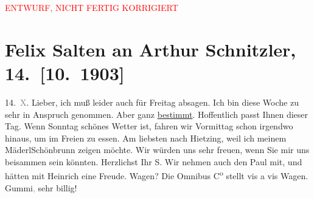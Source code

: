 
\begin{center}
            \textcolor{red}{ENTWURF, NICHT FERTIG KORRIGIERT}
                      \end{center}
            
         
         \renewcommand{\erwaehntePersonen}{Personen: Caroline Kotter, Paul Salten, Heinrich Schnitzler}
         \renewcommand{\erwaehnteOrte}{Orte: Schlosspark Schönbrunn, Wien, XIII., Hietzing}
         \renewcommand{\erwaehnteWerke}{}
               \section[Felix Salten an Arthur Schnitzler, 14. {[}10. 1903{]}]{ Felix Salten an Arthur Schnitzler, 14. {[}10. 1903{]}}\nopagebreak{}\rehead{ }\begin{ledgroupsized}[t]{13cm}\normalsize\beginnumbering \toendnotes[C]{\smallbreak\pagebreak[2]} 
\toendnotes[C]{\smallbreak}\pstart
           \raggedleft{}14. \textcolor{gray}{X}.\pend
           \pstart
           {\pb}Lieber, ich muß leider auch für Freitag absagen. Ich
               bin diese Woche zu sehr in Anspruch genommen. Aber \label{K_L03358-v}\label{K_L03358-h} ganz \uline{bestimmt}. Hoffentlich passt Ihnen dieser Tag. Wenn
                  Sonntag schönes Wetter ist, fahren wir Vormittag schon irgendwo
               hinaus, um im Freien zu essen. Am liebsten nach Hietzing, weil ich meinem MäderlSchönbrunn zeigen möchte. Wir würden uns sehr freuen,
               wenn Sie mir uns beisammen sein könnten. \pend
           \pstart Herzlichst Ihr \spacefill\mbox{S.}\pend{}\pstart
           \noindent{}Wir nehmen auch den Paul mit, und hätten mit Heinrich eine Freude. Wagen? Die Omnibus C\textsuperscript{o} stellt vis a vis Wagen. Gummi\textcolor{gray}{,}
                  sehr billig! \pend
           
         
         \endnumbering{}\end{ledgroupsized}\begin{anhang}\end{anhang}\newcommand{\dateiname}{L03358}\newcommand{\titel}{Felix Salten an Arthur Schnitzler, 14. [10. 1903]}\newcommand{\editorInnen}{Martin Anton Müller und Laura Untner}
      